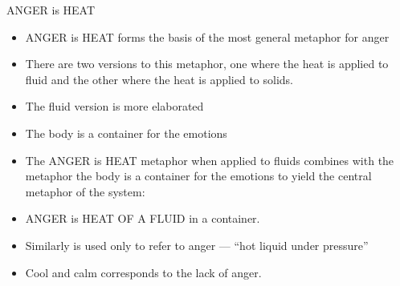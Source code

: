 \begin{frame}[allowframebreaks]{ANGER is HEAT}

\begin{itemize}
\item ANGER is HEAT forms the basis of the most
  general metaphor for anger
\item There are two versions to this metaphor,
  one where the heat is applied to fluid and
  the other where the heat is applied to
  solids.
\item The fluid version is more elaborated
\end{itemize}

\begin{itemize}
\item The body is a container for the emotions
\begin{exe}
  \ex {}
  \ex {}
  \ex {}
  \ex {}
\end{exe}
\framebreak
\item
The ANGER is HEAT metaphor when applied to fluids combines with the
metaphor the body is a container for the emotions to yield the central
metaphor of the system:
\item ANGER is HEAT OF A FLUID in a container.
\begin{exe}
  \ex {}
  \ex {}
  \ex {}
  \ex {}
  \ex {}
\end{exe}

\item Similarly  is used only to refer to anger --- ``hot liquid under
  pressure''

 \framebreak 
\item Cool and calm corresponds to the lack of anger.
\begin{exe}
  \ex {}
  \ex {}
\end{exe}


\end{itemize}
\end{frame}
